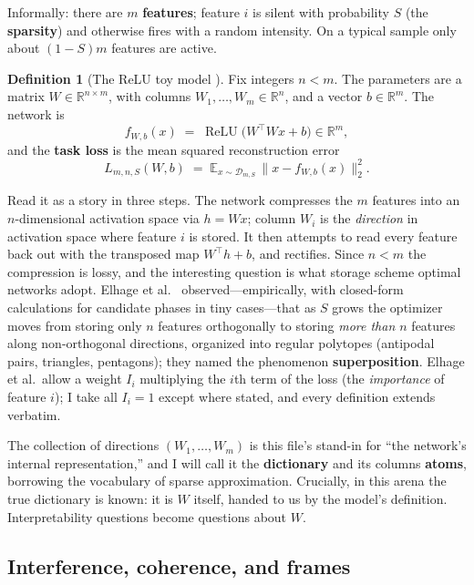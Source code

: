 \documentclass[11pt]{amsart}
\theoremstyle{plain}
\theoremstyle{definition}
\newtheorem{definition}[theorem]{Definition}
\DeclareMathOperator{\relu}{ReLU}
\newcommand{\E}{\mathbb{E}}
\newcommand{\R}{\mathbb{R}}
\begin{document}
Informally: there are $m$ \textbf{features}; feature $i$ is silent with probability $S$ (the \textbf{sparsity}) and otherwise fires with a random intensity. On a typical sample only about $(1-S)m$ features are active.

\begin{definition}[The ReLU toy model \cite{elhage2022}]\label{def:toy}
Fix integers $n<m$. The parameters are a matrix $W\in\R^{n\times m}$, with columns $W_1,\dots,W_m\in\R^n$, and a vector $b\in\R^m$. The network is
\[
f_{W,b}(x) \;=\; \relu\bigl(W^{\top}Wx+b\bigr)\in\R^m ,
\]
and the \textbf{task loss} is the mean squared reconstruction error
\[
L_{m,n,S}(W,b) \;=\; \E_{x\sim\mathcal D_{m,S}}\,\bigl\|x-f_{W,b}(x)\bigr\|_2^2 .
\]
\end{definition}

Read it as a story in three steps. The network compresses the $m$ features into an $n$-dimensional activation space via $h=Wx$; column $W_i$ is the \emph{direction} in activation space where feature $i$ is stored. It then attempts to read every feature back out with the transposed map $W^{\top}h+b$, and rectifies. Since $n<m$ the compression is lossy, and the interesting question is what storage scheme optimal networks adopt. Elhage et al.~\cite{elhage2022} observed---empirically, with closed-form calculations for candidate phases in tiny cases---that as $S$ grows the optimizer moves from storing only $n$ features orthogonally to storing \emph{more than $n$} features along non-orthogonal directions, organized into regular polytopes (antipodal pairs, triangles, pentagons); they named the phenomenon \textbf{superposition}. Elhage et al.\ allow a weight $I_i$ multiplying the $i$th term of the loss (the \emph{importance} of feature $i$); I take all $I_i=1$ except where stated, and every definition extends verbatim.

The collection of directions $(W_1,\dots,W_m)$ is this file's stand-in for ``the network's internal representation,'' and I will call it the \textbf{dictionary} and its columns \textbf{atoms}, borrowing the vocabulary of sparse approximation. Crucially, in this arena the true dictionary is known: it is $W$ itself, handed to us by the model's definition. Interpretability questions become questions about $W$.

\subsection{Interference, coherence, and frames}
\end{document}
